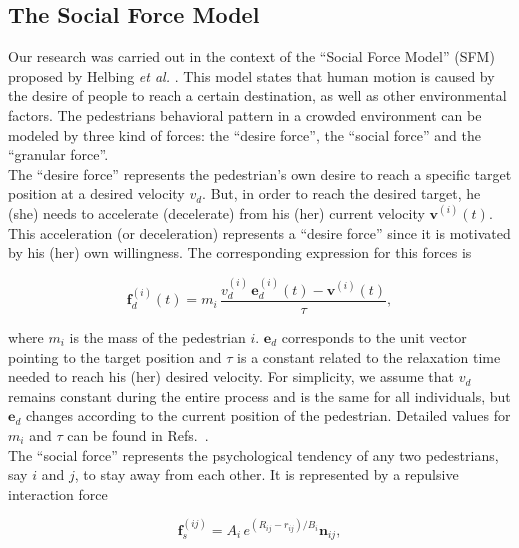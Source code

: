 \documentclass[preprint,12pt]{elsarticle}
\begin{document}
\subsection{\label{sfm}The Social Force Model}

Our research was carried out in the context of the ``Social Force Model'' (SFM) 
proposed by Helbing \textit{et al.} \cite{Helbing1}. This 
model states that human motion is caused by the desire of people to reach a 
certain destination, as well as other environmental factors. The pedestrians 
behavioral pattern in a crowded environment can be modeled by three kind of 
forces: the ``desire force'', the ``social force'' and the ``granular force''.\\

The ``desire force'' represents the pedestrian's own desire to reach a 
specific target position at a desired velocity $v_d$. But, in order to reach 
the desired target, he (she) needs to accelerate (decelerate) from his (her) 
current velocity $\mathbf{v}^{(i)}(t)$. This acceleration (or deceleration) 
represents a ``desire force'' since it is motivated by his (her) own 
willingness. The corresponding expression for this forces is 

\begin{equation}
        \mathbf{f}_d^ {(i)}(t) =  
m_i\,\displaystyle\frac{v_d^{(i)}\,\mathbf{e}_d^
{(i)}(t)-\mathbf{v}^{(i)}(t)}{\tau}, \label{desired}
\end{equation}

where $m_i$ is the mass of the pedestrian $i$. $\mathbf{e}_d$ 
corresponds to the unit vector pointing to the target position and $\tau$ is a 
constant related to the relaxation time needed to reach his (her) desired 
velocity. For simplicity, we assume that $v_d$ remains constant during the 
entire process and is the same for all individuals, but $\mathbf{e}_d$ changes 
according to the current position of the pedestrian. Detailed values for $m_i$ 
and $\tau$ can be found in Refs.~\cite{Helbing1,Dorso3}. \\

The ``social force'' represents the psychological tendency of any two pedestrians,  
say $i$ and $j$, to stay away from each other. It is represented by a repulsive interaction force 

\begin{equation}
        \mathbf{f}_s^{(ij)} = A_i\,e^{(R_{ij}-r_{ij})/B_i}\mathbf{n}_{ij}, 
        \label{social}
\end{equation}
\end{document}
